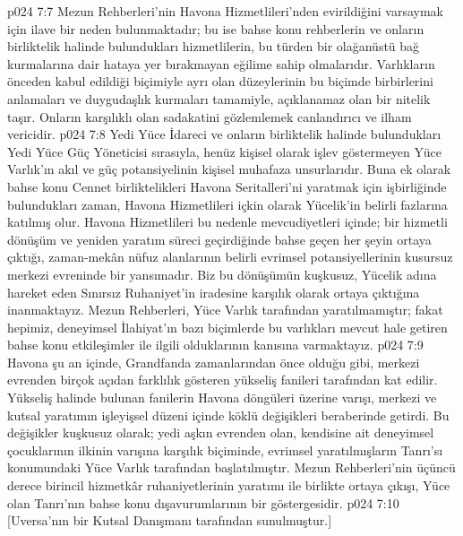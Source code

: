 \vs p024 7:7 Mezun Rehberleri’nin Havona Hizmetlileri’nden evirildiğini varsaymak için ilave bir neden bulunmaktadır; bu ise bahse konu rehberlerin ve onların birliktelik halinde bulundukları hizmetlilerin, bu türden bir olağanüstü bağ kurmalarına dair hataya yer bırakmayan eğilime sahip olmalarıdır. Varlıkların önceden kabul edildiği biçimiyle ayrı olan düzeylerinin bu biçimde birbirlerini anlamaları ve duygudaşlık kurmaları tamamiyle, açıklanamaz olan bir nitelik taşır. Onların karşılıklı olan sadakatini gözlemlemek canlandırıcı ve ilham vericidir.
\vs p024 7:8 Yedi Yüce İdareci ve onların birliktelik halinde bulundukları Yedi Yüce Güç Yöneticisi sırasıyla, henüz kişisel olarak işlev göstermeyen Yüce Varlık’ın akıl ve güç potansiyelinin kişisel muhafaza unsurlarıdır. Buna ek olarak bahse konu Cennet birliktelikleri Havona Seritalleri’ni yaratmak için işbirliğinde bulundukları zaman, Havona Hizmetlileri içkin olarak Yücelik’in belirli fazlarına katılmış olur. Havona Hizmetlileri bu nedenle mevcudiyetleri içinde; bir hizmetli dönüşüm ve yeniden yaratım süreci geçirdiğinde bahse geçen her şeyin ortaya çıktığı, zaman\hyp{}mekân nüfuz alanlarının belirli evrimsel potansiyellerinin kusursuz merkezi evreninde bir yansımadır. Biz bu dönüşümün kuşkusuz, Yücelik adına hareket eden Sınırsız Ruhaniyet’in iradesine karşılık olarak ortaya çıktığına inanmaktayız. Mezun Rehberleri, Yüce Varlık tarafından yaratılmamıştır; fakat hepimiz, deneyimsel İlahiyat’ın bazı biçimlerde bu varlıkları mevcut hale getiren bahse konu etkileşimler ile ilgili olduklarının kanısına varmaktayız.
\vs p024 7:9 Havona şu an içinde, Grandfanda zamanlarından önce olduğu gibi, merkezi evrenden birçok açıdan farklılık gösteren yükseliş fanileri tarafından kat edilir. Yükseliş halinde bulunan fanilerin Havona döngüleri üzerine varışı, merkezi ve kutsal yaratımın işleyişsel düzeni içinde köklü değişikleri beraberinde getirdi. Bu değişikler kuşkusuz olarak; yedi aşkın evrenden olan, kendisine ait deneyimsel çocuklarının ilkinin varışına karşılık biçiminde, evrimsel yaratılmışların Tanrı’sı konumundaki Yüce Varlık tarafından başlatılmıştır. Mezun Rehberleri’nin üçüncü derece birincil hizmetkâr ruhaniyetlerinin yaratımı ile birlikte ortaya çıkışı, Yüce olan Tanrı’nın bahse konu dışavurumlarının bir göstergesidir.
\vs p024 7:10 [Uversa’nın bir Kutsal Danışmanı tarafından sunulmuştur.]
